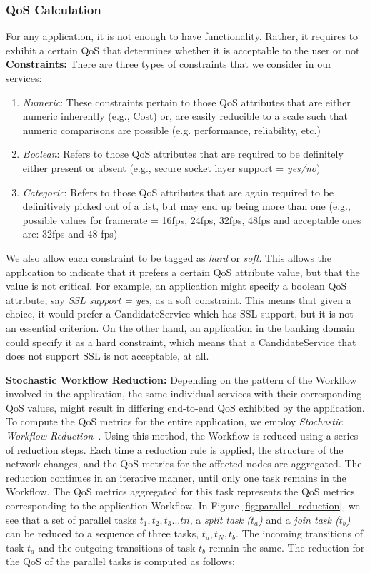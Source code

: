 \documentclass[10pt,journal,compsoc]{IEEEtran}
\begin{document}
\subsubsection{QoS Calculation}
For any application, it is not enough to have functionality. Rather, it requires to exhibit a certain QoS that determines whether it is acceptable to the user or not. \\
\textbf{Constraints:} There are three types of constraints that we consider in our services:
	\begin{enumerate}
	    \item \textit{Numeric}: These constraints pertain to those QoS attributes that are either numeric inherently (e.g., Cost) or, are easily reducible to a scale such that numeric comparisons are possible (e.g. performance, reliability, etc.)
	    \item \textit{Boolean}: Refers to those QoS attributes that are required to be definitely either present or absent (e.g., secure socket layer support = \textit{yes/no})
	    \item \textit{Categoric}: Refers to those QoS attributes that are again required to be definitively picked out of a list, but may end up being more than one (e.g., possible values for framerate = 16fps, 24fps, 32fps, 48fps and acceptable ones are: 32fps and 48 fps) 
	\end{enumerate}
We also allow each constraint to be tagged as \textit{hard} or \textit{soft}. This allows the application to indicate that it prefers a certain QoS attribute value, but that the value is not critical. For example, an application might specify a boolean QoS attribute, say \textit{SSL support = yes}, as a soft constraint. This means that given a choice, it would prefer a CandidateService which has SSL support, but it is not an essential criterion. On the other hand, an application in the banking domain could specify it as a hard constraint, which means that a CandidateService that does not support SSL is not acceptable, at all.

\textbf{Stochastic Workflow Reduction\label{swr}:} Depending on the pattern of the Workflow involved in the application, the same individual services with their corresponding QoS values, might result in differing end-to-end QoS exhibited by the application. To compute the QoS metrics for the entire application, we employ \textit{Stochastic Workflow Reduction}~\cite{Cardoso2002Workflow}. Using this method, the Workflow is reduced using a series of reduction steps. Each time a reduction rule is applied, the structure of the network changes, and the QoS metrics for the affected nodes are aggregated. The reduction continues in an iterative manner, until only one task remains in the Workflow. The QoS metrics aggregated for this task represents the QoS metrics corresponding to the application Workflow. In Figure \ref{fig:parallel_reduction}, we see that a set of parallel tasks $t_{1}, t_{2}, t_{3}...t{n}$, a \textit{split task ($t_{a}$)} and a \textit{join task ($t_{b}$)} can be reduced to a sequence of three tasks, $t_{a}, t_{N}, t_{b}$. The incoming transitions of task $t_{a}$ and the outgoing transitions of task $t_{b}$ remain the same. The reduction for the QoS of the parallel tasks is computed as follows:
\end{document}
